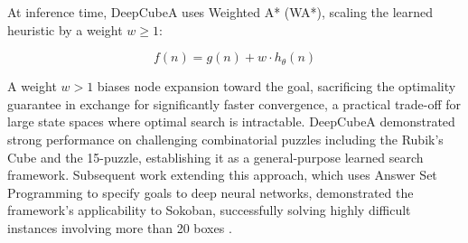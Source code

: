 At inference time, DeepCubeA uses Weighted A* (WA*), scaling the learned heuristic by a weight $w \geq 1$:

$$f(n) = g(n) + w \cdot h_\theta(n)$$

A weight $w > 1$ biases node expansion toward the goal, sacrificing the optimality guarantee in exchange for significantly faster convergence, a practical trade-off for large state spaces where optimal search is intractable. DeepCubeA demonstrated strong performance on challenging combinatorial puzzles including the Rubik's Cube and the 15-puzzle, establishing it as a general-purpose learned search framework. Subsequent work extending this approach, which uses Answer Set Programming to specify goals to deep neural networks, demonstrated the framework's applicability to Sokoban, successfully solving highly difficult instances involving more than 20 boxes \cite{agostinelli2021admissible}.
